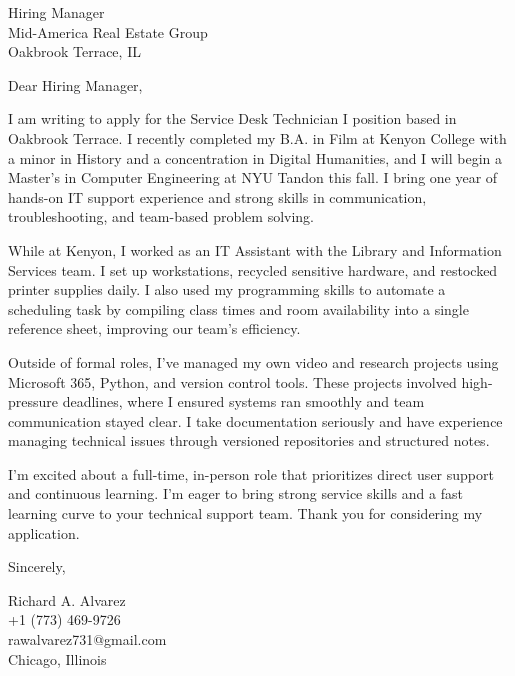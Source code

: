\documentclass[a4paper,10pt]{letter}
\begin{document}
\begin{letter}{
Hiring Manager \\
Mid-America Real Estate Group \\
Oakbrook Terrace, IL}

\opening{Dear Hiring Manager,}

I am writing to apply for the Service Desk Technician I position based in Oakbrook Terrace. I recently completed my B.A. in Film at Kenyon College with a minor in History and a concentration in Digital Humanities, and I will begin a Master’s in Computer Engineering at NYU Tandon this fall. I bring one year of hands-on IT support experience and strong skills in communication, troubleshooting, and team-based problem solving.

While at Kenyon, I worked as an IT Assistant with the Library and Information Services team. I set up workstations, recycled sensitive hardware, and restocked printer supplies daily. I also used my programming skills to automate a scheduling task by compiling class times and room availability into a single reference sheet, improving our team's efficiency.

Outside of formal roles, I’ve managed my own video and research projects using Microsoft 365, Python, and version control tools. These projects involved high-pressure deadlines, where I ensured systems ran smoothly and team communication stayed clear. I take documentation seriously and have experience managing technical issues through versioned repositories and structured notes.

I’m excited about a full-time, in-person role that prioritizes direct user support and continuous learning. I’m eager to bring strong service skills and a fast learning curve to your technical support team. Thank you for considering my application.

\closing{Sincerely,}

Richard A. Alvarez \\
+1 (773) 469-9726 \\
rawalvarez731@gmail.com \\
Chicago, Illinois 

\end{letter}
\end{document}

